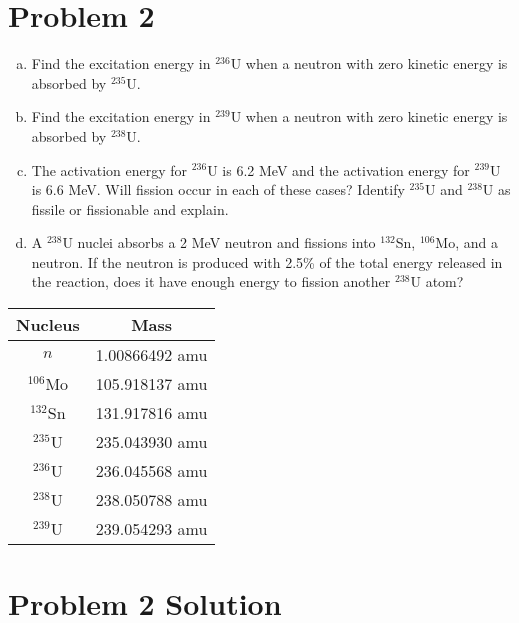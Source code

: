 \documentclass{report}
\newcommand{\tab}{\-\hspace{1.5cm}}
\begin{document}
\newpage
\section*{Problem 2}

\begin{enumerate}[a)]
\item Find the excitation energy in $^{236}$U when a neutron with zero kinetic energy is absorbed by $^{235}$U. 
\item Find the excitation energy in $^{239}$U when a neutron with zero kinetic energy is absorbed by $^{238}$U. 
\item The activation energy for $^{236}$U is 6.2 MeV and the activation energy for $^{239}$U is 6.6 MeV. Will fission occur in each of these cases? Identify $^{235}$U and $^{238}$U as fissile or fissionable and explain.
\item A $^{238}$U nuclei absorbs a 2 MeV neutron and fissions into $^{132}$Sn, $^{106}$Mo, and a neutron. If the neutron is produced with 2.5\% of the total energy released in the reaction, does it have enough energy to fission another $^{238}$U atom?
\end{enumerate}

\begin{table}[htbp]
	\centering
	\begin{tabular}{|c|c|}
			\hline
			Nucleus		&	\tab\- Mass \tab\- \\
			\hline	
			$n$			&  1.00866492 amu \\
			$^{106}$Mo	&  105.918137 amu \\
			$^{132}$Sn	&  131.917816 amu \\
			$^{235}$U	&  235.043930 amu \\
			$^{236}$U	&  236.045568 amu \\	
			$^{238}$U	&  238.050788 amu \\
			$^{239}$U	&  239.054293 amu \\
			\hline
	\end{tabular}
	\label{tab:design-specs}
\end{table}



\section*{Problem 2 Solution}
\end{document}
